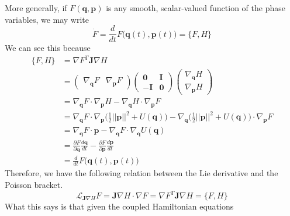       More generally, if $F(\mathbf{q}, \mathbf{p})$ is any smooth, scalar-valued function of the phase variables, we may write 
      \begin{equation}
        \dot{F} = \frac{d}{dt} F \big( \mathbf{q}(t), \mathbf{p}(t)\big) = \{F, H\}
      \end{equation}
      We can see this because 
      \begin{align*}
        \{F, H\} & = \nabla F^T \mathbf{J} \nabla H \\
        & = \begin{pmatrix}
        \nabla_\mathbf{q} F & \nabla_\mathbf{p} F 
        \end{pmatrix} \begin{pmatrix}
         \mathbf{0} & \mathbf{I} \\ -\mathbf{I} & \mathbf{0} 
        \end{pmatrix} \begin{pmatrix}
        \nabla_\mathbf{q} H \\ \nabla_\mathbf{p} H
        \end{pmatrix} \\
        & = \nabla_\mathbf{q} F \cdot \nabla_\mathbf{p} H - \nabla_\mathbf{q} H \cdot \nabla_\mathbf{p} F \\
        & = \nabla_\mathbf{q} F \cdot \nabla_\mathbf{p} \bigg( \frac{1}{2} ||\mathbf{p}||^2 + U(\mathbf{q}) \bigg) - \nabla_\mathbf{q} \bigg( \frac{1}{2} ||\mathbf{p}||^2 + U(\mathbf{q}) \bigg)  \cdot \nabla_\mathbf{p} F \\
        & = \nabla_\mathbf{q} F \cdot \mathbf{p} - \nabla_\mathbf{q} F \cdot \nabla_\mathbf{q} U(\mathbf{q}) \\
        & = \frac{\partial F}{\partial \mathbf{q}} \frac{ d \mathbf{q}}{d t} - \frac{\partial F}{\partial \mathbf{p}} \frac{d \mathbf{p}}{d t} \\
        & = \frac{d}{d t} F \big( \mathbf{q}(t), \mathbf{p}(t) \big) 
      \end{align*}
      Therefore, we have the following relation between the Lie derivative and the Poisson bracket. 
      \begin{equation}
        \mathcal{L}_{\mathbf{J} \nabla H} F = \mathbf{J} \nabla H \cdot \nabla F = \nabla F^T \mathbf{J} \nabla H = \{F, H\}
      \end{equation}
      What this says is that given the coupled Hamiltonian equations
